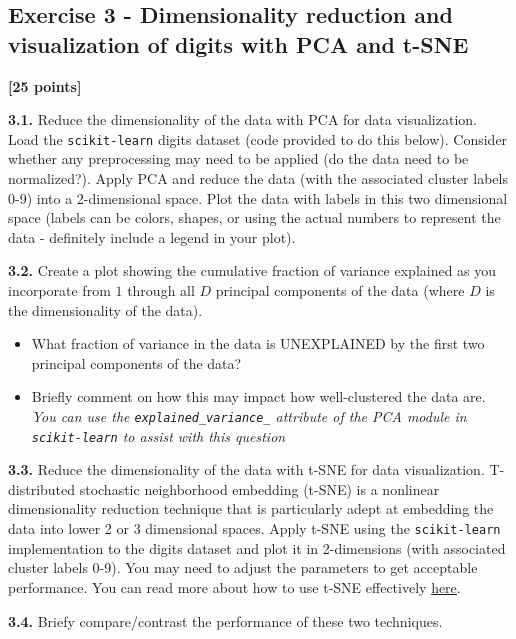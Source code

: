 \documentclass[
  letterpaper,
  DIV=11,
  numbers=noendperiod]{scrartcl}
\providecommand{\tightlist}{%
  \setlength{\itemsep}{0pt}\setlength{\parskip}{0pt}}\usepackage{longtable,booktabs,array}
\begin{document}
\subsection{Exercise 3 - Dimensionality reduction and visualization of
digits with PCA and
t-SNE}\label{exercise-3---dimensionality-reduction-and-visualization-of-digits-with-pca-and-t-sne}

\textbf{{[}25 points{]}}

\textbf{3.1.} Reduce the dimensionality of the data with PCA for data
visualization. Load the \texttt{scikit-learn} digits dataset (code
provided to do this below). Consider whether any preprocessing may need
to be applied (do the data need to be normalized?). Apply PCA and reduce
the data (with the associated cluster labels 0-9) into a 2-dimensional
space. Plot the data with labels in this two dimensional space (labels
can be colors, shapes, or using the actual numbers to represent the data
- definitely include a legend in your plot).

\textbf{3.2.} Create a plot showing the cumulative fraction of variance
explained as you incorporate from \(1\) through all \(D\) principal
components of the data (where \(D\) is the dimensionality of the data).

\begin{itemize}
\tightlist
\item
  What fraction of variance in the data is UNEXPLAINED by the first two
  principal components of the data?
\item
  Briefly comment on how this may impact how well-clustered the data
  are. \emph{You can use the \texttt{explained\_variance\_} attribute of
  the PCA module in \texttt{scikit-learn} to assist with this question}
\end{itemize}

\textbf{3.3.} Reduce the dimensionality of the data with t-SNE for data
visualization. T-distributed stochastic neighborhood embedding (t-SNE)
is a nonlinear dimensionality reduction technique that is particularly
adept at embedding the data into lower 2 or 3 dimensional spaces. Apply
t-SNE using the \texttt{scikit-learn} implementation to the digits
dataset and plot it in 2-dimensions (with associated cluster labels
0-9). You may need to adjust the parameters to get acceptable
performance. You can read more about how to use t-SNE effectively
\href{https://distill.pub/2016/misread-tsne/}{here}.

\textbf{3.4.} Briefy compare/contrast the performance of these two
techniques.
\end{document}

